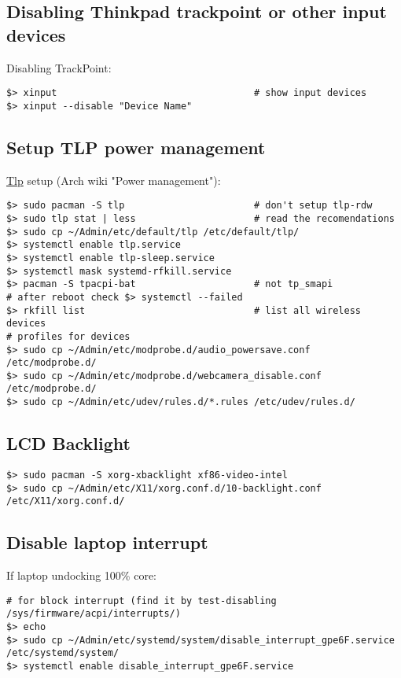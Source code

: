 \documentclass[a4paper, 12pt]{article}
\begin{document}
\subsection{Disabling Thinkpad trackpoint or other input devices}
Disabling TrackPoint:
\begin{lstlisting}
$> xinput                                   # show input devices
$> xinput --disable "Device Name"
\end{lstlisting}

\subsection{Setup TLP power management}
\url{Tlp} setup (Arch wiki "Power management"):
\begin{lstlisting}
$> sudo pacman -S tlp                       # don't setup tlp-rdw
$> sudo tlp stat | less                     # read the recomendations
$> sudo cp ~/Admin/etc/default/tlp /etc/default/tlp/
$> systemctl enable tlp.service
$> systemctl enable tlp-sleep.service
$> systemctl mask systemd-rfkill.service
$> pacman -S tpacpi-bat                     # not tp_smapi
# after reboot check $> systemctl --failed
$> rkfill list                              # list all wireless devices
# profiles for devices
$> sudo cp ~/Admin/etc/modprobe.d/audio_powersave.conf /etc/modprobe.d/
$> sudo cp ~/Admin/etc/modprobe.d/webcamera_disable.conf /etc/modprobe.d/
$> sudo cp ~/Admin/etc/udev/rules.d/*.rules /etc/udev/rules.d/
\end{lstlisting}

\subsection{LCD Backlight}
\begin{lstlisting}
$> sudo pacman -S xorg-xbacklight xf86-video-intel
$> sudo cp ~/Admin/etc/X11/xorg.conf.d/10-backlight.conf /etc/X11/xorg.conf.d/
\end{lstlisting}

\subsection{Disable laptop interrupt}
If laptop undocking 100\% core:
\begin{lstlisting}
# for block interrupt (find it by test-disabling /sys/firmware/acpi/interrupts/)
$> echo
$> sudo cp ~/Admin/etc/systemd/system/disable_interrupt_gpe6F.service /etc/systemd/system/
$> systemctl enable disable_interrupt_gpe6F.service
\end{lstlisting}
\end{document}
